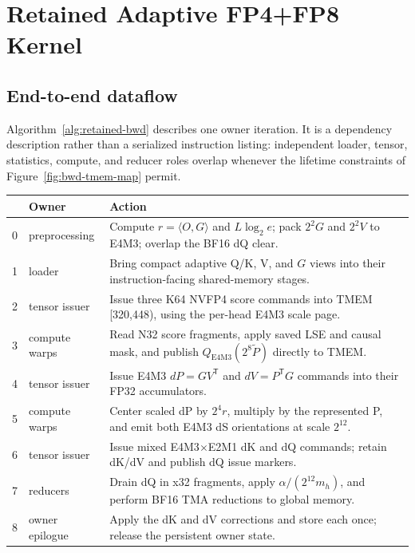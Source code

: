 \section{Retained Adaptive FP4+FP8 Kernel}

\subsection{End-to-end dataflow}

Algorithm~\ref{alg:retained-bwd} describes one owner iteration.  It is a
dependency description rather than a serialized instruction listing:
independent loader, tensor, statistics, compute, and reducer roles overlap
whenever the lifetime constraints of Figure~\ref{fig:bwd-tmem-map} permit.

\begin{algorithm}[htbp]
\caption{Retained adaptive low-precision backward for one K/V owner}
\label{alg:retained-bwd}
\small
\begin{tabularx}{\textwidth}{@{}r p{} X@{}}
\toprule
& Owner & Action \\
\midrule
0 & preprocessing & Compute $r=\langle O,G\rangle$ and $L\log_2e$; pack
$2^2G$ and $2^2V$ to E4M3; overlap the BF16 dQ clear. \\
1 & loader & Bring compact adaptive Q/K, V, and $G$ views into their
instruction-facing shared-memory stages. \\
2 & tensor issuer & Issue three K64 NVFP4 score commands into
TMEM [320,448), using the per-head E4M3 scale page. \\
3 & compute warps & Read N32 score fragments, apply saved LSE and causal mask,
and publish $Q_{\mathrm{E4M3}}(2^8\widetilde P)$ directly to TMEM. \\
4 & tensor issuer & Issue E4M3 $dP=GV^\mathsf T$ and
$dV=P^\mathsf TG$ commands into their FP32 accumulators. \\
5 & compute warps & Center scaled dP by $2^4r$, multiply by the represented
P, and emit both E4M3 dS orientations at scale $2^{12}$. \\
6 & tensor issuer & Issue mixed E4M3$\times$E2M1 dK and dQ commands; retain
dK/dV and publish dQ issue markers. \\
7 & reducers & Drain dQ in x32 fragments, apply
$\alpha/(2^{12}m_h)$, and perform BF16 TMA reductions to global memory. \\
8 & owner epilogue & Apply the dK and dV corrections and store each once;
release the persistent owner state. \\
\bottomrule
\end{tabularx}
\end{algorithm}


